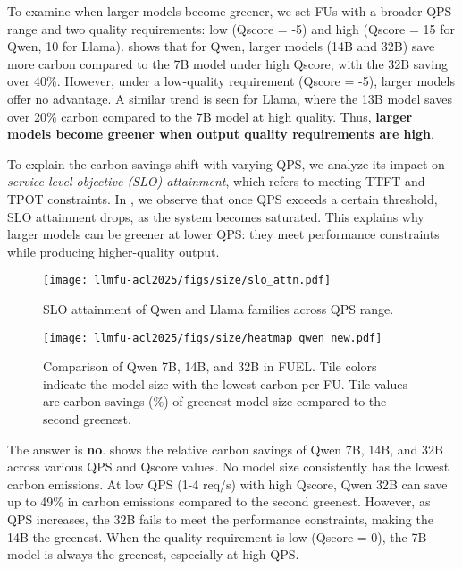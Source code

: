 To examine when larger models become greener, we set FUs with a broader QPS range and two quality requirements: low (Qscore = -5) and high (Qscore = 15 for Qwen, 10 for Llama).  shows that for Qwen, larger models (14B and 32B) save more carbon compared to the 7B model under high Qscore, with the 32B saving over 40\%. However, under a low-quality requirement (Qscore = -5), larger models offer no advantage. A similar trend is seen for Llama, where the 13B model saves over 20\% carbon compared to the 7B model at high quality. Thus, \textbf{larger models become greener when output quality requirements are high}.

To explain the carbon savings shift with varying QPS, we analyze its impact on \emph{service level objective (SLO) attainment}, which refers to meeting TTFT and TPOT constraints. In , we observe that once QPS exceeds a certain threshold, SLO attainment drops, as the system becomes saturated. This explains why larger models can be greener at lower QPS: they meet performance constraints while producing higher-quality output.



\begin{figure}[!t]
    \centering
    \texttt{[image: llmfu-acl2025/figs/size/slo\_attn.pdf]}
    \vspace{-0.15in}
    \caption{SLO attainment of Qwen and Llama families across QPS range.}
    \label{fig:size_slo_attn}
\end{figure}

\begin{figure}[!t]
    \centering
    \texttt{[image: llmfu-acl2025/figs/size/heatmap\_qwen\_new.pdf]}
    \vspace{-0.15in}
    \caption{Comparison of Qwen 7B, 14B, and 32B in FUEL. Tile colors indicate the model size with the lowest carbon per FU. Tile values are carbon savings (\%) of greenest model size compared to the second greenest.}
    \label{fig:size_heatmap}
\end{figure}



\noindent The answer is \textbf{no}.  shows the relative carbon savings of Qwen 7B, 14B, and 32B across various QPS and Qscore values. No model size consistently has the lowest carbon emissions. At low QPS (1-4 req/s) with high Qscore, Qwen 32B can save up to 49\% in carbon emissions compared to the second greenest. However, as QPS increases, the 32B fails to meet the performance constraints, making the 14B the greenest. When the quality requirement is low (Qscore = 0), the 7B model is always the greenest, especially at high QPS.


